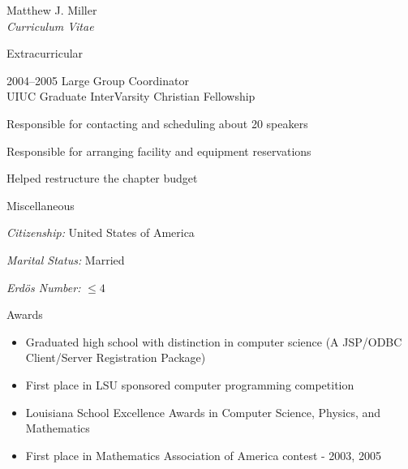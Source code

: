 \documentclass[10pt]{article}
\newenvironment{subbulletlist}{%
	\begin{list}{\labelitemii}{%
		\setlength{\topsep}{\itemsep}\setlength{\parskip}{\parsep}%
	}%
}%
{ \end{list} }
\begin{document}
\begin{cv}{Matthew J. Miller\\{\large \itshape Curriculum Vitae}}
\begin{cvlist}{Extracurricular}
	\item[2004--2005] Large Group Coordinator\\
	UIUC Graduate InterVarsity Christian Fellowship
	\begin{subbulletlist}
	\item Responsible for contacting and scheduling about 20 
	speakers 
	\item Responsible for arranging facility and equipment
	reservations
	\item Helped restructure the chapter budget
	\end{subbulletlist}
\end{cvlist}

\setlength{\oldcvlabelwidth}{\cvlabelwidth}
\setlength{\cvlabelwidth}{1em}
\begin{cvlist}{Miscellaneous}
\item \textit{Citizenship:} United States of America
\item \textit{Marital Status:} Married
\item \textit{Erd\"{o}s Number:} $\leq 4$
\end{cvlist}



\begin{cvlist}{Awards}
\item
\begin{itemize}\itemsep=0.25em
	\item Graduated high school with distinction in computer science (A JSP/ODBC Client/Server Registration Package)
	\item First place in LSU sponsored computer programming competition
	\item Louisiana School Excellence Awards in Computer Science, Physics, and Mathematics
	\item First place in Mathematics Association of America contest - 2003, 2005
\end{itemize}
\end{cvlist}

\setlength{\cvlabelwidth}{\oldcvlabelwidth}

\end{cv}
\end{document}
